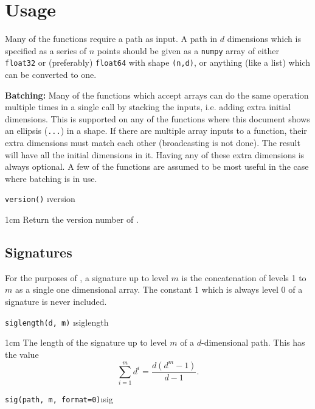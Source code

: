 \documentclass[a4paper]{extarticle}
\newenvironment{defn}{\begin{adjustwidth}{1cm}{}\ignorespaces}{\end{adjustwidth}\ignorespacesafterend}
\begin{document}
\section{Usage}

Many of the functions require a path as input. A path in $d$ dimensions which is specified as a series of $n$ points should be given as a \verb|numpy| array of either \verb|float32| or (preferably) \verb|float64| with shape \verb|(n,d)|, or anything (like a list) which can be converted to one.

\textbf{Batching:} Many of the functions which accept arrays can do the same operation multiple times in a single call by stacking the inputs, i.e. adding extra initial dimensions. This is supported on any of the functions where this document shows an ellipsis (\verb|...|)  in a shape. If there are multiple array inputs to a function, their extra dimensions must match each other (broadcasting is not done).  The result will have all the initial dimensions in it. Having any of these extra dimensions is always optional. A few of the functions are assumed to be most useful in the case where batching is in use. %

\verb!version()! \i{version}

\begin{defn}
\nopagebreak Return the version number of \ii.
\end{defn}


\subsection{Signatures}
For the purposes of \ii, a signature up to level $m$ is the concatenation of levels 1 to $m$ as a single one dimensional array. The constant 1 which is always level 0 of a signature is never included. 

\verb!siglength(d, m)! \i{siglength}
\begin{defn}
\nopagebreak The length of the signature up to level $m$ of a $d$-dimensional path. This has the value
\[\sum_{i=1}^m d^i = \frac{d(d^m-1)}{d-1}.\]
\end{defn}

\verb!sig(path, m, format=0)!\i{sig}
\end{document}
